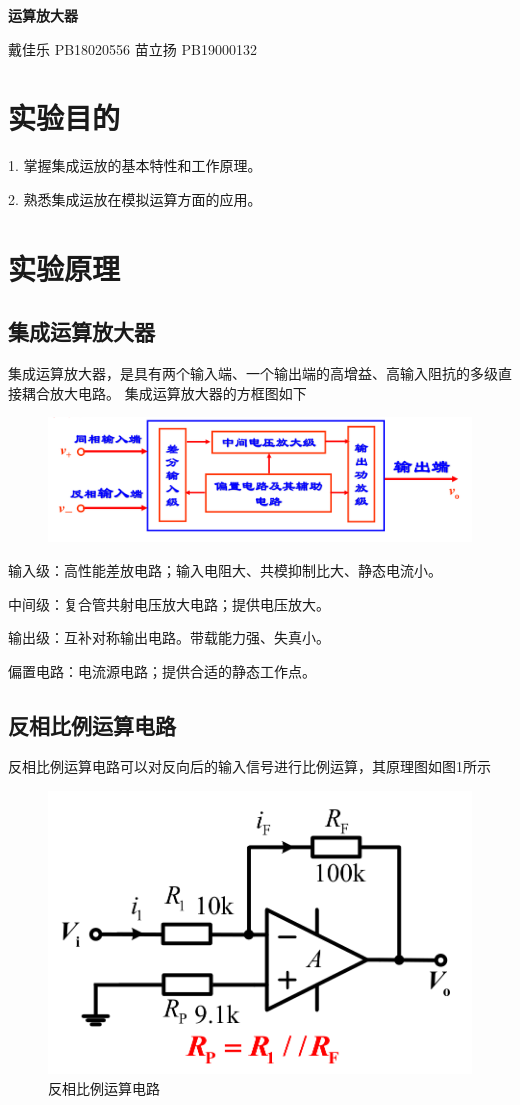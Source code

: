 \documentclass[UTF8]{article}
\begin{document}

	\begin{center}
		\LARGE{\textbf{运算放大器}}

		\vspace*{0.2cm}
		\normalsize{戴佳乐 \quad PB18020556 \quad 苗立扬 \quad PB19000132}
	\end{center}
	\normalsize
	\section{实验目的}
	1. 掌握集成运放的基本特性和工作原理。
    
    2. 熟悉集成运放在模拟运算方面的应用。

	\section{实验原理}
    \subsection{集成运算放大器}
    集成运算放大器，是具有两个输入端、一个输出端的高增益、高输入阻抗的多级直接耦合放大电路。
    集成运算放大器的方框图如下

    \begin{figure}[htbp]
		\centering
        \includegraphics[width=0.8\linewidth]{sbbb0}
	\end{figure}

    输入级：高性能差放电路；输入电阻大、共模抑制比大、静态电流小。

中间级：复合管共射电压放大电路；提供电压放大。

输出级：互补对称输出电路。带载能力强、失真小。

偏置电路：电流源电路；提供合适的静态工作点。


	\subsection{反相比例运算电路}
    反相比例运算电路可以对反向后的输入信号进行比例运算，其原理图如图1所示

    \begin{figure}[htbp]
		\centering
        \includegraphics[width=0.5\linewidth]{sbbb1}
        \caption{反相比例运算电路}
	\end{figure}
\end{document}

